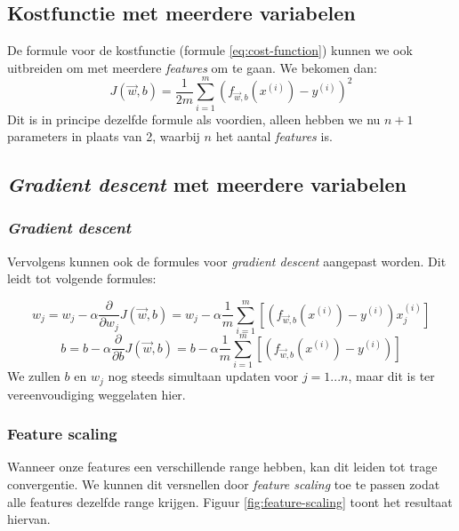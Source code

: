 \subsection{Kostfunctie met meerdere variabelen}

De formule voor de kostfunctie (formule \ref{eq:cost-function}) kunnen we ook uitbreiden om met meerdere \textit{features} om te gaan. We bekomen dan:
\begin{equation}
	J(\vec{w}, b) = \frac{1}{2m}\sum_{i=1}^{m}(f_{\vec{w},b}(x^{(i)}) - y^{(i)})^{2}
	\label{eq:cost-function-multi}
\end{equation}
\noindent
Dit is in principe dezelfde formule als voordien, alleen hebben we nu $n+1$ parameters in plaats van 2, waarbij $n$ het aantal \textit{features} is.

\subsection{\textit{Gradient descent} met meerdere variabelen}

\subsubsection{\textit{Gradient descent}}

Vervolgens kunnen ook de formules voor \textit{gradient descent} aangepast worden. Dit leidt tot volgende formules:

\begin{equation}
	w_{j} = w_{j} - \alpha \frac{\partial}{\partial w_{j}} J(\vec{w}, b) = w_{j} - \alpha \frac{1}{m}\sum_{i=1}^{m}[(f_{\vec{w},b}(x^{(i)}) - y^{(i)})x^{(i)}_{j}]
	\label{eq:gradient-descent-lin-reg-multi-w}
\end{equation}
\begin{equation}
	b = b - \alpha \frac{\partial}{\partial b} J(\vec{w}, b) = b - \alpha \frac{1}{m}\sum_{i=1}^{m}[(f_{\vec{w},b}(x^{(i)}) - y^{(i)})]
	\label{eq:gradient-descent-lin-reg-multi-b}
\end{equation}
\noindent
We zullen $b$ en $w_{j}$ nog steeds simultaan updaten voor $j = 1...n$, maar dit is ter vereenvoudiging weggelaten hier.

\subsubsection{Feature scaling}

Wanneer onze features een verschillende range hebben, kan dit leiden tot trage convergentie. We kunnen dit versnellen door \textit{feature scaling} toe te passen zodat alle features dezelfde range krijgen. Figuur \ref{fig:feature-scaling} toont het resultaat hiervan.

